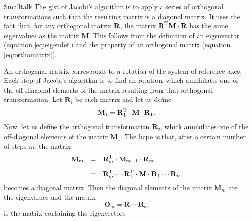 \begin{displaycode}{Smalltalk}
The gist of Jacobi's algorithm is to apply a series of orthogonal
transformations such that the resulting matrix is a diagonal
matrix. It uses the fact that, for any orthogonal matrix ${\textbf
R}$, the matrix $\textbf{R}^{\mathop\textrm{T}}\textbf{M}\cdot\textbf{R}$ has the same
eigenvalues as the matrix $\textbf{M}$. This follows from the
definition of an eigenvector (equation \ref{eq:eigendef}) and the
property of an orthogonal matrix (equation \ref{eq:orthomatrix}).

An orthogonal matrix corresponds to a rotation of the system of
reference axes. Each step of Jacobi's algorithm is to find an
rotation, which annihilates one of the off-diagonal elements of
the matrix resulting from that orthogonal transformation. Let
$\textbf{R}_1$ be such matrix and let us define
\begin{equation}
  \textbf{M}_1 = \textbf{R}^{\mathop\textrm{T}}_1\cdot\textbf{M}\cdot\textbf{R}_1.
\end{equation}
Now, let us define the orthogonal transformation $\textbf{R}_2$,
which annihilates one of the off-diagonal elements of the matrix
$\textbf{M}_1$. The hope is that, after a certain number of steps
$m$, the matrix
\begin{equation}
  \begin{array}{lcl}
    \textbf{M}_m & = &\textbf{R}^{\mathop\textrm{T}}_m\cdot\textbf{M}_{m-1}\cdot{\textbf
    R}_m\\*[2ex]
      & = &\textbf{R}^{\mathop\textrm{T}}_m\cdots\textbf{R}^{\mathop\textrm{T}}_1\cdot\textbf{M}\cdot{\textbf
      R}_1\cdots\textbf{R}_m
  \end{array}
\end{equation}
becomes a diagonal matrix. Then the diagonal elements of the
matrix $\textbf{M}_m$ are the eigenvalues and the matrix
\begin{equation}
    \textbf{O}_m = \textbf{R}_1\cdots\textbf{R}_m
\end{equation}
is the matrix containing the eigenvectors.


\end{displaycode}

